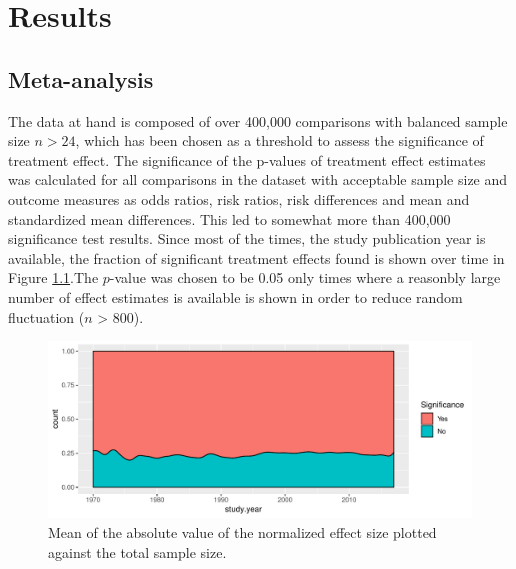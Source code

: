 \documentclass[11pt,a4paper,twoside]{book}\usepackage[]{graphicx}\usepackage[]{color}
\newenvironment{knitrout}{}{} %
\begin{document}












\chapter{Results}




\section{Meta-analysis}
The data at hand is composed of over 400,000 comparisons with balanced sample size $n > 24$, which has been chosen as a threshold to assess the significance of treatment effect. The significance of the p-values of treatment effect estimates was calculated for all comparisons in the dataset with acceptable sample size and outcome measures as odds ratios, risk ratios, risk differences and mean and standardized mean differences. This led to somewhat more than 400,000 significance test results. Since most of the times, the study publication year is available, the fraction of significant treatment effects found is shown over time in Figure \ref{study.significance.overtime}.The $p$-value was chosen to be 0.05  only times where a reasonbly large number of effect estimates is available is shown in order to reduce random fluctuation ($n$ > 800). 

\begin{figure}
\begin{knitrout}
\color{fgcolor}

{\centering \includegraphics[width=\textwidth-3cm]{figure/ch02_figunnamed-chunk-13-1} 

}



\end{knitrout}
\caption{Mean of the absolute value of the normalized effect size plotted against the total sample size.}
\label{study.significance.overtime}
\end{figure}
\end{document}
